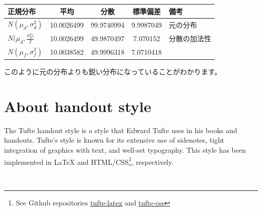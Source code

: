 \documentclass[]{tufte-handout}
\begin{document}
\begin{longtable}[]{@{}lcccl@{}}
\toprule
正規分布 & 平均 & 分散 & 標準偏差 & 備考 \\
\midrule
\endhead
\(N(\mu_d, \sigma^2_d)\) & 10.0026499 & 99.9740994 & 9.9987049 &
元の分布 \\
\(N(\mu_d, \frac{\sigma^2_d)}{2}\) & 10.0026499 & 49.9870497 & 7.070152
& 分散の加法性 \\
\(N(\mu_f, \sigma^2_f)\) & 10.0038582 & 49.9996318 & 7.0710418 & \\
\bottomrule
\end{longtable}

このように元の分布よりも鋭い分布になっていることがわかります。

\newpage

\hypertarget{about-handout-style}{%
\section{\texorpdfstring{\textbf{About handout
style}}{About handout style}}\label{about-handout-style}}

The Tufte handout style is a style that Edward Tufte uses in his books
and handouts. Tufte's style is known for its extensive use of sidenotes,
tight integration of graphics with text, and well-set typography. This
style has been implemented in LaTeX and HTML/CSS\footnote{See Github
  repositories
  \href{https://github.com/tufte-latex/tufte-latex}{tufte-latex} and
  \href{https://github.com/edwardtufte/tufte-css}{tufte-css}},
respectively.

　


\end{document}
